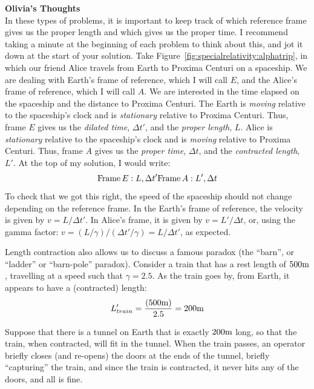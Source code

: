 \begin{framed}
\textbf{Olivia's Thoughts}\\
In these types of problems, it is important to keep track of which reference frame gives us the proper length and which gives us the proper time. I recommend taking a minute at the beginning of each problem to think about this, and jot it down at the start of your solution. Take Figure~\ref{fig:specialrelativity:alphatrip}, in which our friend Alice travels from Earth to Proxima Centuri on a spaceship. We are dealing with Earth's frame of reference, which I will call $E$, and the Alice's frame of reference, which I will call $A$. We are interested in the time elapsed on the spaceship and the distance to Proxima Centuri. The Earth is \textit{moving} relative to the spaceship's clock and is \textit{stationary} relative to Proxima Centuri. Thus, frame $E$ gives us the \textit{dilated time}, $\Delta t'$, and the \textit{proper length}, $L$. Alice is \textit{stationary} relative to the spaceship's clock and is \textit{moving} relative to Proxima Centuri. Thus, frame $A$ gives us the \textit{proper time}, $\Delta t$, and the \textit{contracted length}, $L'$.\newline
At the top of my solution, I would write:
\begin{equation}
\textrm{Frame}\, E: L, \Delta t'\\
\textrm{Frame}\, A: L', \Delta t
\end{equation}
To check that we got this right, the speed of the spaceship should not change depending on the reference frame. In the Earth's frame of reference, the velocity is given by $v=L/\Delta t'$. In Alice's frame, it is given by $v=L'/\Delta t$, or, using the gamma factor:  $v=(L/\gamma)/(\Delta t'/\gamma)=L/\Delta t'$, as expected.
\end{framed}

Length contraction also allows us to discuss a famous paradox (the ``barn'', or ``ladder'' or ``barn-pole'' paradox). Consider a train that has a rest length of $500 {\rm m}$, travelling at a speed such that $\gamma = 2.5$. As the train goes by, from Earth, it appears to have a (contracted) length:
\begin{equation}
L'_{train}=\frac{(500 {\rm m})}{2.5}=200 {\rm m}
\end{equation}

Suppose that there is a tunnel on Earth that is exactly $200 {\rm m}$ long, so that the train, when contracted, will fit in the tunnel. When the train passes, an operator briefly closes (and re-opens) the doors at the ends of the tunnel, briefly ``capturing'' the train, and since the train is contracted, it never hits any of the doors, and all is fine.

